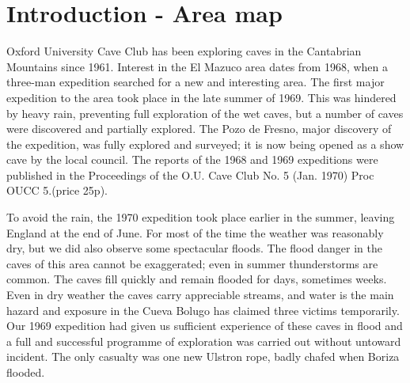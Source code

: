 \documentclass[11pt, a4paper, twoside]{memoir}
\begin{document}
 

\clearpage
\thispagestyle{empty}
\listoftodos
{} %
\clearpage


\clearpage
\setcounter{secnumdepth}{4}
\setcounter{tocdepth}{4}
\tableofcontents

\clearpage
\listoffigures

\clearpage
\listoftables

\clearpage
%


\chapter{Introduction - Area map}

Oxford University Cave Club has been exploring caves in the Cantabrian Mountains since 1961. Interest in the El Mazuco area dates from 1968, when a three-man expedition searched for a new and interesting area. The first major expedition to the area took place in the late summer of 1969. This was hindered by heavy rain, preventing full exploration of the wet caves, but a number of caves were discovered and partially explored. The Pozo de Fresno, major discovery of the expedition, was fully explored and surveyed; it is now being opened as a show cave by the local council. The reports of the 1968 and 1969 expeditions were published in the Proceedings of the O.U. Cave Club No. 5 (Jan. 1970) Proc OUCC 5.(price 25p).

To avoid the rain, the 1970 expedition took place earlier in the summer, leaving England at the end of June. For most of the time the weather was reasonably dry, but we did also observe some spectacular floods. The flood danger in the caves of this area cannot be exaggerated; even in summer thunderstorms are common. The caves fill quickly and remain flooded for days, sometimes weeks. Even in dry weather the caves carry appreciable streams, and water is the main hazard and exposure in the Cueva Bolugo has claimed three victims temporarily. Our 1969 expedition had given us sufficient experience of these caves in flood and a full and successful programme of exploration was carried out without untoward incident. The only casualty was one new Ulstron rope, badly chafed when Boriza flooded.
\end{document}
